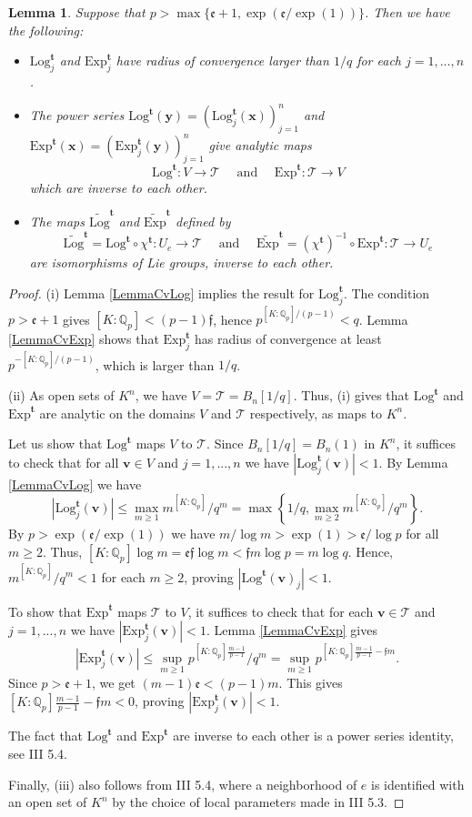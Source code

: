\documentclass[11pt]{amsart}
\newtheorem{lemma}[theorem]{Lemma}
\theoremstyle{remark}
\numberwithin{equation}{section}
\newcommand{\efrak}{\mathfrak{e}}
\newcommand{\ffrak}{\mathfrak{f}}
\newcommand{\Tcal}{\mathscr{T}}
\newcommand{\Q}{\mathbb{Q}}
\newcommand{\xx}{\mathbf{x}}
\newcommand{\yy}{\mathbf{y}}
\newcommand{\ttt}{\mathbf{t}}
\newcommand{\vv}{\mathbf{v}}
\newcommand{\Exp}{\mathrm{Exp}}
\newcommand{\Log}{\mathrm{Log}}
\begin{document}
\begin{lemma}\label{LemmaKeyLogExp} Suppose that $p>\max\{\efrak +1 , \exp(\efrak/\exp(1))\}$. Then we have the following:
\begin{itemize}
\item[(i)]  $\Log^\ttt_j$ and $\Exp^\ttt_j$ have radius of convergence larger than $1/q$ for each $j=1,...,n$. 
\item[(ii)] The power series $\Log^\ttt(\yy)=(\Log^\ttt_j(\xx))_{j=1}^n$ and $\Exp^\ttt(\xx)=(\Exp^\ttt_j(\yy))_{j=1}^n$ give analytic maps
$$
\Log^\ttt : V\to \Tcal\quad  \mbox{ and }\quad \Exp^\ttt:\Tcal\to V
$$
which are inverse to each other.
\item[(iii)] The maps $\widetilde{\Log}^\ttt$ and $\widetilde{\Exp}^\ttt$ defined by
$$
\widetilde{\Log}^\ttt=\Log^\ttt \circ \chi^\ttt: U_e\to \Tcal\quad  \mbox{ and }\quad \widetilde{\Exp}^\ttt=(\chi^\ttt)^{-1}\circ \Exp^\ttt:\Tcal\to U_e
$$
are isomorphisms of Lie groups, inverse to each other.
\end{itemize}
\end{lemma}
\begin{proof} (i)  Lemma \ref{LemmaCvLog} implies the result for $\Log^\ttt_j$. The condition $p>\efrak+1$ gives $[K:\Q_p]<(p-1)\ffrak$, hence $p^{[K:\Q_p]/(p-1)}<q$. Lemma \ref{LemmaCvExp} shows that $\Exp^\ttt_j$ has radius of convergence at least $p^{-[K:\Q_p]/(p-1)}$, which is larger than $1/q$.

(ii) As open sets of $K^n$, we have $V=\Tcal=B_n[1/q]$. Thus, (i) gives that $\Log^\ttt$ and $\Exp^\ttt$ are analytic on the domains $V$ and $\Tcal$ respectively, as maps to $K^n$.

Let us show that $\Log^\ttt$ maps $V$ to $\Tcal$. Since $B_n[1/q]=B_n(1)$ in $K^n$, it suffices to check that for all $\vv\in V$ and $j=1,...,n$ we have $|\Log^\ttt_j(\vv)|<1$. By Lemma \ref{LemmaCvLog} we have 
$$
|\Log^\ttt_j(\vv)|\le \max_{m\ge 1} m^{[K:\Q_p]}/q^m =\max\left\{1/q , \max_{m\ge 2} m^{[K:\Q_p]}/q^m\right\}. 
$$
By $p>\exp(\efrak/\exp(1))$ we have $m/\log m> \exp(1)> \efrak/\log p$ for all $m\ge 2$. Thus, $[K:\Q_p]\log m =\efrak\ffrak\log m < \ffrak m\log p=m\log q$. Hence, $m^{[K:\Q_p]}/q^m<1$ for each $m\ge 2$, proving  $|\Log^\ttt(\vv)_j|<1$.

To show that $\Exp^\ttt$ maps $\Tcal$ to $V$, it suffices to check that for each $\vv\in \Tcal$ and $j=1,...,n$ we have $|\Exp^\ttt_j(\vv)|<1$. Lemma \ref{LemmaCvExp} gives 
$$
|\Exp^\ttt_j(\vv)|\le \sup_{m\ge 1} p^{[K:\Q_p]\frac{m-1}{p-1}}/q^m = \sup_{m\ge 1} p^{[K:\Q_p]\frac{m-1}{p-1} -\ffrak m}.
$$
Since $p>\efrak+1$, we get $(m-1)\efrak < (p-1)m$. This gives $[K:\Q_p]\frac{m-1}{p-1} -\ffrak m<0$, proving $|\Exp^\ttt_j(\vv)|<1$.

The fact that $\Log^\ttt$ and $\Exp^\ttt$ are inverse to each other is a power series identity, see \cite{Bourbaki} III 5.4.

Finally, (iii) also follows from \cite{Bourbaki} III 5.4, where a neighborhood of $e$ is identified with an open set of $K^n$ by the choice of local parameters made in \cite{Bourbaki} III 5.3.
\end{proof}
\end{document}
